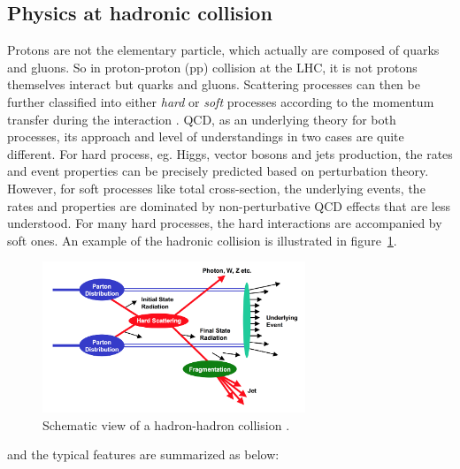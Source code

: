 \subsection{Physics at hadronic collision}
\label{hadroniccollision}

Protons are not the elementary particle, which actually are composed of quarks and gluons.
So in proton-proton (pp) collision at the LHC, it is not protons themselves interact but quarks and gluons.
Scattering processes can then be further classified into either \textit{hard} or \textit{soft} processes
according to the momentum transfer during the interaction \cite{Dremin:2005wd}.
QCD, as an underlying theory for both processes, its approach and level of understandings in two cases are quite different.
For hard process, eg. Higgs, vector bosons and jets production, the rates and event
properties can be precisely predicted based on perturbation theory.
However, for soft processes like total cross-section, the underlying events, the rates and properties are dominated by non-perturbative QCD effects
that are less understood.
For many hard processes, the hard interactions are accompanied by soft ones.
An example of the hadronic collision is illustrated in figure~\ref{fig:C2_had_col}. 
\begin{figure}[!htb]
  \centering
  \includegraphics[width=0.7\textwidth]{figures/Theory/hh_collision.png}
  \caption{Schematic view of a hadron-hadron collision \cite{Womersley:2000cx}.}
  \label{fig:C2_had_col}
\end{figure}
and the typical features are summarized as below:
